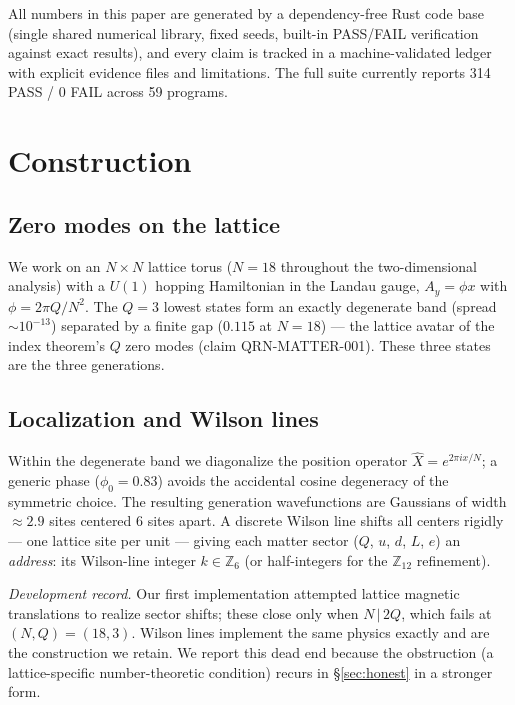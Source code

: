 \documentclass[aps,prd,preprint,nofootinbib]{revtex4-2}
\begin{document}
All numbers in this paper are generated by a dependency-free Rust code base
(single shared numerical library, fixed seeds, built-in PASS/FAIL verification
against exact results), and every claim is tracked in a machine-validated
ledger with explicit evidence files and limitations. The full suite currently
reports 314 PASS / 0 FAIL across 59 programs.

\section{Construction}

\subsection{Zero modes on the lattice}

We work on an $N\times N$ lattice torus ($N=18$ throughout the two-dimensional
analysis) with a $U(1)$ hopping Hamiltonian in the Landau gauge, $A_y=\phi x$
with $\phi=2\pi Q/N^2$. The $Q=3$ lowest states form an exactly degenerate band
(spread $\sim 10^{-13}$) separated by a finite gap ($0.115$ at $N=18$) --- the
lattice avatar of the index theorem's $Q$ zero modes (claim QRN-MATTER-001).
These three states are the three generations.

\subsection{Localization and Wilson lines}

Within the degenerate band we diagonalize the position operator
$\hat X=e^{2\pi i x/N}$; a generic phase ($\phi_0=0.83$) avoids the accidental
cosine degeneracy of the symmetric choice. The resulting generation
wavefunctions are Gaussians of width $\approx 2.9$ sites centered 6 sites
apart. A discrete Wilson line shifts all centers rigidly --- one lattice site
per unit --- giving each matter sector ($Q$, $u$, $d$, $L$, $e$) an
\emph{address}: its Wilson-line integer $k\in\mathbb{Z}_6$ (or half-integers
for the $\mathbb{Z}_{12}$ refinement).

\emph{Development record.} Our first implementation attempted lattice magnetic
translations to realize sector shifts; these close only when $N\,|\,2Q$, which
fails at $(N,Q)=(18,3)$. Wilson lines implement the same physics exactly and
are the construction we retain. We report this dead end because the obstruction
(a lattice-specific number-theoretic condition) recurs in \S\ref{sec:honest} in
a stronger form.
\end{document}
